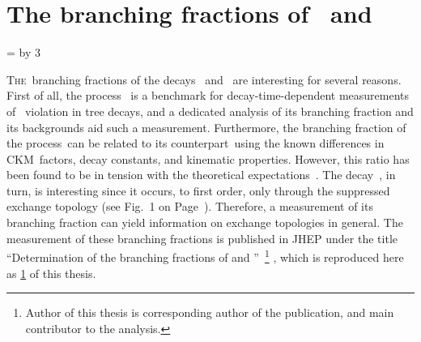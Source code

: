 \chapter{The branching fractions of \BsDsK~and \BdDsK}
\label{chp:DsK_BF}

\newcount\DsKBFFigPage
\DsKBFFigPage=\thepage
\advance\DsKBFFigPage by 3

\lettrine{T}{he}~branching fractions of the decays \BsDsK~and \BdDsK~are interesting for several reasons.
First of all, the process \BsDsK~is a benchmark for decay-time-dependent measurements of \CP~violation in tree decays, and a dedicated analysis of its branching fraction and its backgrounds aid such a measurement.
Furthermore, the branching fraction of the process~\BsDsK can be related to its counterpart~\BsDsPi using the known differences in CKM~factors, decay constants, and kinematic properties.
However, this ratio has been found to be in tension with the theoretical expectations~\cite{DeBruyn:2012jp}.
The decay~\BdDsK, in turn, is interesting since it occurs, to first order, only through the suppressed exchange topology (see Fig.~1 on Page~\the\DsKBFFigPage).
Therefore, a measurement of its branching fraction can yield information on exchange topologies in general.
The measurement of these branching fractions is published in \mbox{JHEP} under the title ``Determination of the branching fractions of \BsDsK and \mbox{\BdDsK''}~\cite{LHCb-PAPER-2014-064}\footnote{
    Author of this thesis is corresponding author of the publication, and main contributor to the analysis.}
, which is reproduced here as \cref{chp:DsK_BF} of this thesis.



